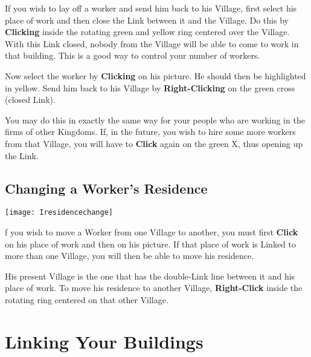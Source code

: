 If you wish to lay off a worker and send him back to his Village, first select his place of work and then close the Link between it and the Village. Do this by \textbf{Clicking} inside the rotating green and yellow ring centered over the Village. With this Link closed, nobody from the Village will be able to come to work in that building. This is a good way to control your number of workers.


Now select the worker by \textbf{Clicking} on his picture. He should then be highlighted in yellow. Send him back to his Village by \textbf{Right-Clicking} on the green cross (closed Link).


You may do this in exactly the same way for your people who are working in the firms of other Kingdoms. If, in the future, you wish to hire some more workers from that Village, you will have to \textbf{Click} again on the green X, thus opening up the Link.

\subsection{\textsf{Changing a Worker’s Residence}}


\begin{center}
    \texttt{[image: Iresidencechange]} %
\end{center}

f you wish to move a Worker from one Village to another, you must first \textbf{Click} on his place of work and then on his picture. If that place of work is Linked to more than one Village, you will then be able to move his residence.


His present Village is the one that has the double-Link line between it and his place of work. To move his residence to another Village, \textbf{Right-Click} inside the rotating ring centered on that other Village.

\section{\textsf{Linking Your Buildings}}


